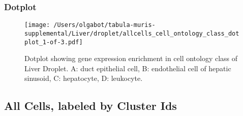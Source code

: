 \newpage
\newpage
\subsubsection{Dotplot}
\begin{figure}[h]
\centering
\texttt{[image: /Users/olgabot/tabula-muris-supplemental/Liver/droplet/allcells\_cell\_ontology\_class\_dotplot\_1-of-3.pdf]}

\caption{ Dotplot  showing gene expression enrichment in cell ontology class of Liver Droplet. A: duct epithelial cell, B: endothelial cell of hepatic sinusoid, C: hepatocyte, D: leukocyte.}
\end{figure}


\newpage
\subsection{All Cells, labeled by Cluster Ids}
